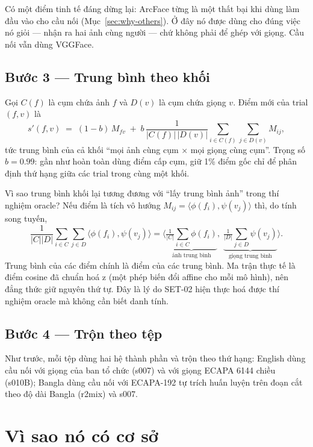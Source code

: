 \documentclass[11pt,a4paper]{article}
\begin{document}
Có một điểm tinh tế đáng dừng lại: ArcFace từng là một thất bại khi dùng làm đầu vào cho cầu nối (Mục~\ref{sec:why-others}). Ở đây nó được dùng cho đúng việc nó giỏi --- nhận ra hai ảnh cùng người --- chứ không phải để ghép với giọng. Cầu nối vẫn dùng VGGFace.

\subsection{Bước 3 --- Trung bình theo khối}
Gọi $C(f)$ là cụm chứa ảnh $f$ và $D(v)$ là cụm chứa giọng $v$. Điểm mới của trial $(f,v)$ là
\begin{equation}
s'(f,v) \;=\; (1-b)\,M_{fv} \;+\; b\,\frac{1}{|C(f)|\,|D(v)|}\sum_{i\in C(f)}\sum_{j\in D(v)} M_{ij},
\label{eq:block}
\end{equation}
tức trung bình của cả khối ``mọi ảnh cùng cụm $\times$ mọi giọng cùng cụm''. Trọng số $b=0.99$: gần như hoàn toàn dùng điểm cấp cụm, giữ 1\% điểm gốc chỉ để phân định thứ hạng giữa các trial trong cùng một khối.

Vì sao trung bình khối lại tương đương với ``lấy trung bình ảnh'' trong thí nghiệm oracle? Nếu điểm là tích vô hướng $M_{ij}=\langle \phi(f_i),\psi(v_j)\rangle$ thì, do tính song tuyến,
\begin{equation}
\frac{1}{|C||D|}\sum_{i\in C}\sum_{j\in D}\langle \phi(f_i),\psi(v_j)\rangle
= \Big\langle \underbrace{\tfrac{1}{|C|}\textstyle\sum_{i\in C}\phi(f_i)}_{\text{ảnh trung bình}},\;
\underbrace{\tfrac{1}{|D|}\textstyle\sum_{j\in D}\psi(v_j)}_{\text{giọng trung bình}}\Big\rangle .
\end{equation}
Trung bình của các điểm chính là điểm của các trung bình. Ma trận thực tế là điểm cosine đã chuẩn hoá z (một phép biến đổi affine cho mỗi mô hình), nên đẳng thức giữ nguyên thứ tự. Đây là lý do SET-02 hiện thực hoá được thí nghiệm oracle mà không cần biết danh tính.

\subsection{Bước 4 --- Trộn theo tệp}
Như trước, mỗi tệp dùng hai hệ thành phần và trộn theo thứ hạng: English dùng cầu nối với giọng của ban tổ chức (s007) và với giọng ECAPA 6144 chiều (s010B); Bangla dùng cầu nối với ECAPA-192 tự trích huấn luyện trên đoạn cắt theo độ dài Bangla (r2mix) và s007.

\section{Vì sao nó có cơ sở}
\end{document}
